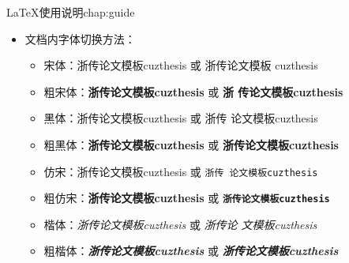 \begin{cuzchapter}{\LaTeX{}使用说明}{chap:guide}
\begin{itemize}
\begin{itemize}
			      \item 正文行距：启用和设置 \verb|\linespread{1.5}|，默认1.5倍
			            行距。
			      \item 参考文献行距：修改 \verb|\setlength{\bibsep}{0.0ex}|
			      \item 目录显示级数：修改 \verb|\setcounter{tocdepth}{2}|
			      \item 文档超链接的颜色及其显示：修改 \verb|\hypersetup|
		      \end{itemize}
		\item 文档内字体切换方法：
		      \begin{itemize}
			      \item 宋体：浙传论文模板cuzthesis 或 \textrm{浙传论文模板
				            cuzthesis}
			      \item 粗宋体：{\bfseries 浙传论文模板cuzthesis} 或 \textbf{浙
				            传论文模板cuzthesis}
			      \item 黑体：{\sffamily 浙传论文模板cuzthesis} 或 \textsf{浙传
				            论文模板cuzthesis}
			      \item 粗黑体：{\bfseries\sffamily 浙传论文模板cuzthesis} 或
			            \textsf{\bfseries 浙传论文模板cuzthesis}
			      \item 仿宋：{\ttfamily 浙传论文模板cuzthesis} 或 \texttt{浙传
				            论文模板cuzthesis}
			      \item 粗仿宋：{\bfseries\ttfamily 浙传论文模板cuzthesis} 或
			            \texttt{\bfseries 浙传论文模板cuzthesis}
			      \item 楷体：{\itshape 浙传论文模板cuzthesis} 或 \textit{浙传论
				            文模板cuzthesis}
			      \item 粗楷体：{\bfseries\itshape 浙传论文模板cuzthesis} 或
			            \textit{\bfseries 浙传论文模板cuzthesis}
		      \end{itemize}
	\end{itemize}

\end{cuzchapter}

